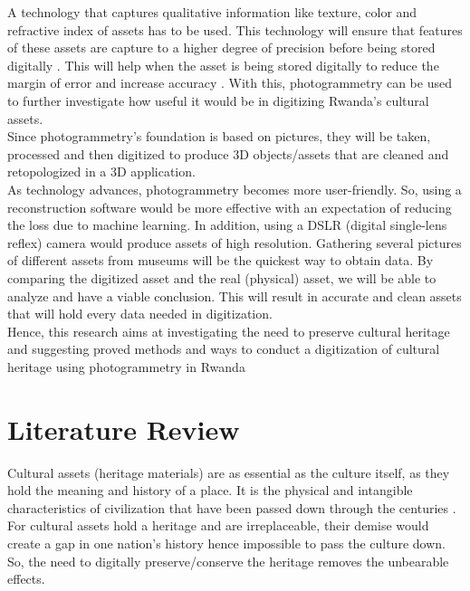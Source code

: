 \documentclass[conference]{IEEEtran}
\begin{document}
A technology that captures qualitative information like texture, color and refractive index of assets has to be used. This technology will ensure that features
of these assets are capture to a higher degree of precision before being stored digitally \cite{Linder2006}. This will help when
the asset is being stored digitally to reduce the margin of error and increase accuracy \cite{accphtgm}. With this, photogrammetry can be used to further
investigate how useful it would be in digitizing Rwanda's cultural assets. \\

Since photogrammetry's foundation is based on pictures, they will be taken, processed and then digitized to produce 3D objects/assets that are cleaned and retopologized in
a 3D application. \\

As technology advances, photogrammetry becomes more user-friendly. So, using a reconstruction software
would be more effective with an expectation of reducing the loss due to machine learning. In addition, using a DSLR (digital single-lens reflex) camera would produce assets of
high resolution. Gathering several pictures of different assets from museums will be the quickest way to obtain data. By comparing the digitized
asset and the real (physical) asset, we will be able to analyze and have a viable conclusion. This will result in accurate and clean assets that will
hold every data needed in digitization. \\

Hence, this research aims at investigating the need to preserve cultural heritage and suggesting proved methods and ways to conduct a digitization of cultural heritage using
photogrammetry in Rwanda

\section{\textbf{Literature Review}}
Cultural assets (heritage materials) are as essential as the culture itself, as they hold the meaning and history of a place.
It is the physical and intangible characteristics of civilization that have been passed down through the centuries \cite{WILLIS2014145}. For cultural assets hold a heritage
and are irreplaceable, their demise would create a gap in one nation's history hence impossible to pass the culture down.
So, the need to digitally preserve/conserve the heritage removes the unbearable effects. \\
\end{document}
